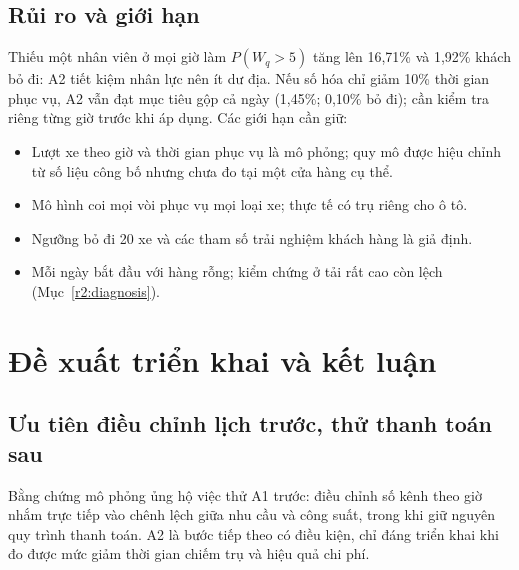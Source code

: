 \subsection{Rủi ro và giới hạn}
Thiếu một nhân viên ở mọi giờ làm $P(W_q{>}5)$ tăng lên 16,71\% và 1,92\% khách
bỏ đi: A2 tiết kiệm nhân lực nên ít dư địa. Nếu số hóa chỉ giảm 10\% thời gian
phục vụ, A2 vẫn đạt mục tiêu gộp cả ngày (1,45\%; 0,10\% bỏ đi); cần kiểm tra riêng từng giờ trước khi áp dụng. Các giới hạn cần giữ:
\begin{itemize}
\item Lượt xe theo giờ và thời gian phục vụ là mô phỏng; quy mô được hiệu chỉnh
từ số liệu công bố nhưng chưa đo tại một cửa hàng cụ thể.
\item Mô hình coi mọi vòi phục vụ mọi loại xe; thực tế có trụ riêng cho ô tô.
\item Ngưỡng bỏ đi 20 xe và các tham số trải nghiệm khách hàng là giả định.
\item Mỗi ngày bắt đầu với hàng rỗng; kiểm chứng ở tải rất cao còn lệch (Mục~\ref{r2:diagnosis}).
\end{itemize}

\section{Đề xuất triển khai và kết luận}
\label{r3:conclusion}
\subsection{Ưu tiên điều chỉnh lịch trước, thử thanh toán sau}
Bằng chứng mô phỏng ủng hộ việc thử A1 trước: điều chỉnh số kênh theo giờ
nhắm trực tiếp vào chênh lệch giữa nhu cầu và công suất, trong khi giữ
nguyên quy trình thanh toán. A2 là bước tiếp theo có điều kiện, chỉ đáng
triển khai khi đo được mức giảm thời gian chiếm trụ và hiệu quả chi phí.

